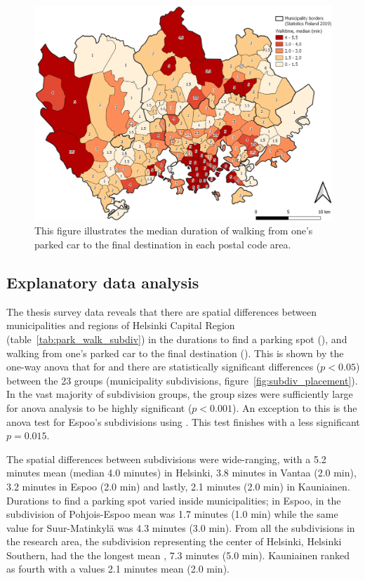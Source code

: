 \begin{figure}[H]%
    \centering
    \includegraphics[width=\textwidth]{images/thesis_postalvis_walkmedian.png}
    \caption[Walktime, median, in the research area]{This figure illustrates the median duration of walking from one's parked car to the final destination in each postal code area.}%
    \label{fig:postalvis_walkmedian}%
\end{figure}

\newpage
\subsection{Explanatory data analysis}
\justify

The thesis survey data reveals that there are spatial differences between municipalities and regions of Helsinki Capital Region (table~\ref{tab:park_walk_subdiv}) in the durations to find a parking spot (), and walking from one's parked car to the final destination (). This is shown by the one-way \acrfull{anova} that for  and  there are statistically significant differences ($p < 0.05$) between the 23 groups (municipality subdivisions, figure~\ref{fig:subdiv_placement}). In the vast majority of subdivision groups, the group sizes were sufficiently large for \acrshort{anova} analysis to be highly significant ($p < 0.001$). An exception to this is the \acrshort{anova} test for Espoo's subdivisions using . This test finishes with a less significant $p = 0.015$.

The spatial differences between subdivisions were wide-ranging, with a 5.2 minutes mean (median 4.0 minutes)  in Helsinki, 3.8 minutes in Vantaa (2.0 min), 3.2 minutes in Espoo (2.0 min) and lastly, 2.1 minutes (2.0 min) in Kauniainen. Durations to find a parking spot varied inside municipalities; in Espoo, in the subdivision of Pohjois-Espoo mean  was 1.7 minutes (1.0 min) while the same value for Suur-Matinkylä was 4.3 minutes (3.0 min). From all the subdivisions in the research area, the subdivision representing the center of Helsinki, Helsinki Southern, had the the longest mean , 7.3 minutes (5.0 min). Kauniainen ranked as fourth with a  values 2.1 minutes mean (2.0 min).

